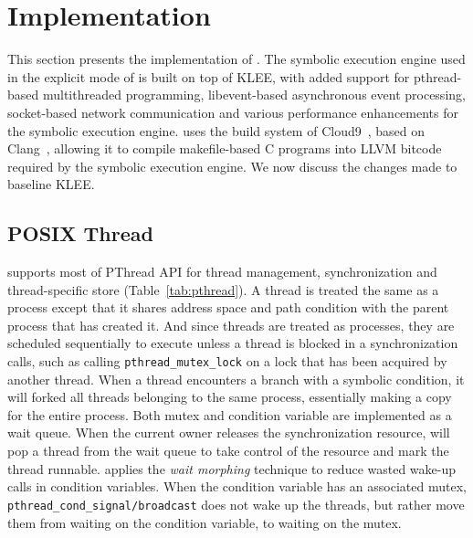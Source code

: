 \section{Implementation}\label{sec:implementation}

This section presents the implementation of \lancet.
The symbolic execution engine used in the explicit mode of \lancet is built on top of KLEE, with added support for pthread-based multithreaded programming, libevent-based asynchronous event processing, socket-based network communication and various performance enhancements for the symbolic execution engine.
\lancet uses the build system of Cloud9~\cite{cloud9}, based on Clang~\cite{clang}, allowing it to compile makefile-based C programs into LLVM bitcode~\cite{llvm-bitcode} required by the symbolic execution engine.
We now discuss the changes made to baseline KLEE.

\subsection{POSIX Thread}
\label{sec:pthread}

\lancet supports most of PThread API for thread management, synchronization and thread-specific store (Table~\ref{tab:pthread}).
A thread is treated the same as a process except that it shares address space and path condition with the parent process that has created it.
And since threads are treated as processes, they are scheduled sequentially to execute unless a thread is blocked in a synchronization calls, such as calling {\tt pthread\_mutex\_lock} on a lock that has been acquired by another thread.
When a thread encounters a branch with a symbolic condition, it will forked all threads belonging to the same process, essentially making a copy for the entire process.
Both mutex and condition variable are implemented as a wait queue.
When the current owner releases the synchronization resource, \lancet will pop a thread from the wait queue to take control of the resource and mark the thread runnable.
\lancet applies the {\em wait morphing} technique to reduce wasted wake-up calls in condition variables.
When the condition variable has an associated mutex, {\tt pthread\_cond\_signal/broadcast} does not wake up the threads, but rather move them from waiting on the condition variable, to waiting on the mutex.

